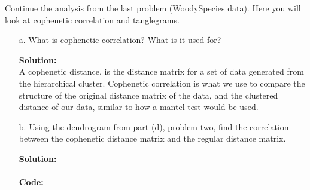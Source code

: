 \documentclass[12pt]{article}
\makeatletter
\theoremstyle{homework}
\newenvironment{exercise}[1]
{\def\@currentlabel{#1}\exercisecore}
{\endexercisecore}
\newcommand{\localhead}[1]{\par\smallskip\noindent\textbf{#1}\nobreak\\}%
\newcommand\solution{\localhead{Solution:}}
\makeatother
\begin{document}
\begin{exercise}{3} Continue the analysis from the last problem (WoodySpecies data). Here you will look at cophenetic correlation and tanglegrams.\\
  \begin{enumerate}
    \item[a.] What is cophenetic correlation? What is it used for?\\
    \solution  A cophenetic distance, is the distance matrix for a set of data generated from the hierarchical cluster. Cophenetic correlation is what we use 
    to compare the structure of the original distance matrix of the data, and the clustered distance of our data, similar to how a mantel test would be used.
    \vspace{.15in}
    
    
    \item[b.] Using the dendrogram from part (d), problem two, find the correlation between the cophenetic distance matrix and the regular distance matrix.\\
    \solution  \\
    \textbf{Code:}
    \begin{center}
    
    \end{center}
    \vspace{.15in}


\end{enumerate}
\end{exercise}
\end{document}
